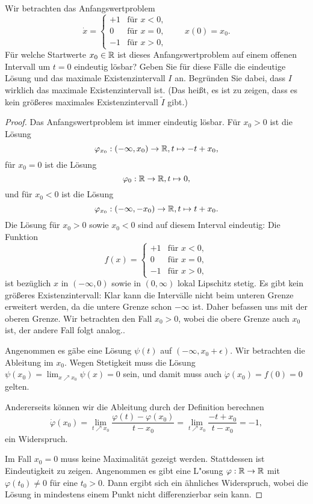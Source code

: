 \begin{Problem}
	Wir betrachten das Anfangswertproblem
	\[\dot{x}=\begin{cases}
		+1 & \text{f\"{u}r }x<0,\\
		0 & \text{f\"{u}r }x=0,\\
		-1 & \text{f\"{u}r }x>0,
		\end{cases}\qquad x(0)=x_0.\]
		Für welche Startwerte $x_0\in \mathbb{R}$ ist dieses Anfangswertproblem auf einem offenen Intervall um $t = 0$ eindeutig lösbar? Geben Sie für diese Fälle die eindeutige Lösung und das maximale Existenzintervall $I$ an. Begründen Sie dabei, dass $I$ wirklich das maximale Existenzintervall ist. (Das heißt, es ist zu zeigen, dass es kein größeres maximales Existenzintervall $\tilde{I}$ gibt.)
\end{Problem}
\begin{proof}
	Das Anfangswertproblem ist immer eindeutig lösbar. F\"{u}r $x_0>0$ ist die L\"{o}sung
	\[\varphi_{x_0}: (-\infty, x_0)\to \mathbb{R}, t\mapsto -t+x_0,\]
	f\"{u}r $x_0=0$ ist die L\"{o}sung
	\[\varphi_0: \mathbb{R} \to \mathbb{R}, t\mapsto 0,\]
	und f\"{u}r $x_0<0$ ist die L\"{o}sung
	\[\varphi_{x_0}: (-\infty, -x_0)\to \mathbb{R}, t\mapsto t+x_0.\]
	Die L\"{o}sung f\"{u}r $x_0>0$ sowie $x_0<0$ sind auf diesem Interval eindeutig: Die Funktion
	\[f(x)=\begin{cases}
		+1 & \text{f\"{u}r }x<0,\\
		0 & \text{f\"{u}r }x=0,\\
		-1 & \text{f\"{u}r }x>0,
	\end{cases}\]
	ist bez\"{u}glich $x$ in $(-\infty, 0)$ sowie in $(0, \infty)$ lokal Lipschitz stetig. Es gibt kein größeres Existenzintervall: Klar kann die Intervälle nicht beim unteren Grenze erweitert werden, da die untere Grenze schon $-\infty$ ist. Daher befassen uns mit der oberen Grenze. Wir betrachten den Fall $x_0>0$, wobei die obere Grenze auch $x_0$ ist, der andere Fall folgt analog..
	
	Angenommen es gäbe eine Lösung $\psi(t)$ auf $(-\infty, x_0+\epsilon)$. Wir betrachten die Ableitung im $x_0$. Wegen Stetigkeit muss die L\"{o}sung $\psi(x_0)=\lim_{x\nearrow x_0} \psi(x)=0$ sein, und damit muss auch $\dot{\varphi}(x_0)=f(0)=0$ gelten. 
	
	Andererseits können wir die Ableitung durch der Definition berechnen
	\[\dot{\varphi}(x_0)=\lim_{t\nearrow x_0}\frac{\varphi(t) -\varphi(x_0)}{t - x_0}=\lim_{t\nearrow x_0}\frac{- t+x_0}{t-x_0}=-1,\]
	ein Widerspruch.
	
	Im Fall $x_0=0$ muss keine Maximalität gezeigt werden. Stattdessen ist Eindeutigkeit zu zeigen. Angenommen es gibt eine L"{o}sung $\varphi: \mathbb{R} \to \mathbb{R}$ mit $\varphi(t_0)\neq 0$ f\"{u}r eine $t_0>0$. Dann ergibt sich ein ähnliches Widerspruch, wobei die L\"{o}sung in mindestens einem Punkt nicht differenzierbar sein kann. 
	\end{proof}

